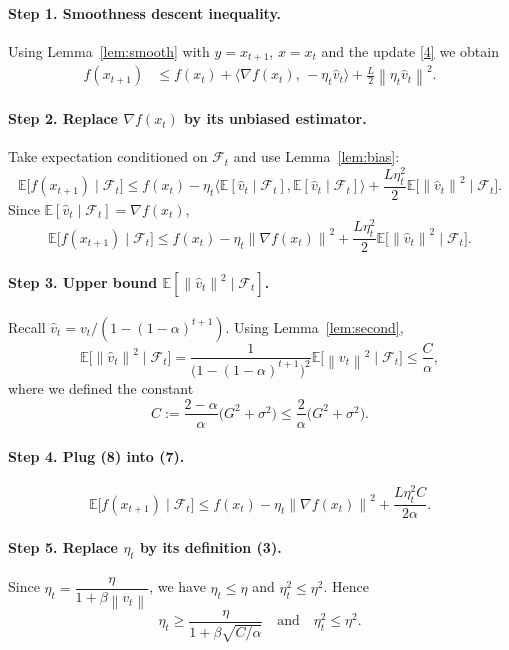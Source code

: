 \documentclass{article}
\newcommand{\E}{\mathbb{E}}
\newcommand{\norm}[1]{\left\lVert#1\right\rVert}
\begin{document}
\paragraph{Step 1. Smoothness descent inequality.}
Using Lemma~\ref{lem:smooth} with $y=x_{t+1}$, $x=x_t$ and the update \eqref{4} we obtain
\[
\begin{aligned}
f(x_{t+1})
&\le f(x_t)+\big\langle \nabla f(x_t),\, -\eta_t\hat v_t\big\rangle
   +\frac{L}{2}\norm{\eta_t\hat v_t}^2 .
\end{aligned}
\tag{5}
\]
\paragraph{Step 2. Replace $\nabla f(x_t)$ by its unbiased estimator.}
Take expectation conditioned on $\mathcal{F}_t$ and use Lemma~\ref{lem:bias}:
\[
\E\!\bigl[f(x_{t+1})\mid\mathcal{F}_t\bigr]
\le f(x_t)-\eta_t \big\langle \E[\hat v_t\mid\mathcal{F}_t],\E[\hat v_t\mid\mathcal{F}_t]\big\rangle
   +\frac{L\eta_t^2}{2}\E\!\bigl[\norm{\hat v_t}^2\mid\mathcal{F}_t\bigr].
\tag{6}
\]
Since $\E[\hat v_t\mid\mathcal{F}_t]=\nabla f(x_t)$,
\[
\E\!\bigl[f(x_{t+1})\mid\mathcal{F}_t\bigr]
\le f(x_t)-\eta_t \norm{\nabla f(x_t)}^2
   +\frac{L\eta_t^2}{2}\E\!\bigl[\norm{\hat v_t}^2\mid\mathcal{F}_t\bigr].
\tag{7}
\]

\paragraph{Step 3. Upper bound $\E[\norm{\hat v_t}^2\mid\mathcal{F}_t]$.}
Recall $\hat v_t=v_t/(1-(1-\alpha)^{t+1})$.  Using Lemma~\ref{lem:second},
\[
\E\!\bigl[\norm{\hat v_t}^2\mid\mathcal{F}_t\bigr]
= \frac{1}{\bigl(1-(1-\alpha)^{t+1}\bigr)^2}
   \E\!\bigl[\norm{v_t}^2\mid\mathcal{F}_t\bigr]
\le \frac{C}{\alpha},
\tag{8}
\]
where we defined the constant
\[
C:=\frac{2-\alpha}{\alpha}\bigl(G^2+\sigma^2\bigr)
\le \frac{2}{\alpha}\bigl(G^2+\sigma^2\bigr).
\]

\paragraph{Step 4. Plug (8) into (7).}
\[
\E\!\bigl[f(x_{t+1})\mid\mathcal{F}_t\bigr]
\le f(x_t)-\eta_t \norm{\nabla f(x_t)}^2
   +\frac{L\eta_t^2 C}{2\alpha}.
\tag{9}
\]

\paragraph{Step 5. Replace $\eta_t$ by its definition (3).}
Since $\eta_t=\dfrac{\eta}{1+\beta\norm{v_t}}$, we have $\eta_t\le\eta$ and $\eta_t^2\le\eta^2$.  Hence
\[
\eta_t \ge \frac{\eta}{1+\beta\sqrt{C/\alpha}} \quad\text{and}\quad
\eta_t^2 \le \eta^2 .
\tag{10}
\]
\end{document}
